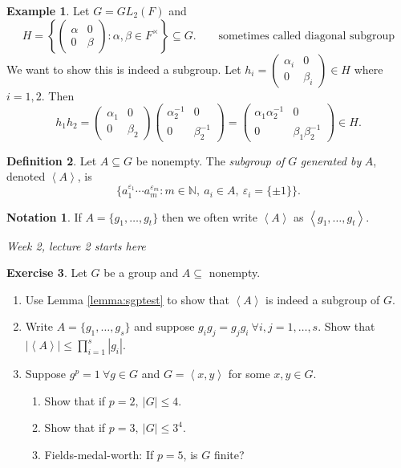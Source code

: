 \documentclass[a4paper]{article}
\newcommand{\la}{\left\langle}
\newcommand{\ra}{\right\rangle}
\newcommand{\N}{\mathbb{N}}
\theoremstyle{definition}
\newtheorem{defn}{Definition}[subsection]
\newtheorem{example}[defn]{Example}
\newtheorem{exe}[defn]{Exercise}
\newtheorem*{notation}{Notation}
\begin{document}
\begin{example}
Let $G=GL_2(F)$ and
\[
H=\left\{\begin{pmatrix}
  \alpha & 0 \\ 0 & \beta
\end{pmatrix}:\alpha,\beta\in F^{\times}\right\} \subseteq G. \qquad\text{sometimes called diagonal subgroup}
\]
We want to show this is indeed a subgroup. Let $h_i=\begin{pmatrix}
  \alpha_i & 0 \\ 0 & \beta_i
\end{pmatrix}\in H$ where $i=1,2$. Then
\[
h_1h_2=\begin{pmatrix}
  \alpha_1 & 0 \\ 0 & \beta_2
\end{pmatrix}\begin{pmatrix}
  \alpha_2^{-1} & 0 \\ 0 & \beta_2^{-1}
\end{pmatrix}=\begin{pmatrix}
  \alpha_1 \alpha_2^{-1} & 0 \\ 0 & \beta_1\beta_2^{-1}
\end{pmatrix}\in H .
\]
\end{example}
\begin{defn}
Let $A\subseteq G$ be nonempty. The \textit{subgroup of} $G$ \textit{generated by} $A$, denoted $\la A\ra$, is
\[
\{a_1^{\varepsilon_1}\cdots a_m^{\varepsilon_m}:m\in\N,\ a_i\in A,\ \varepsilon_i=\{\pm 1\}\}.
\]
\end{defn}
\begin{notation}
If $A=\{g_1,\ldots,g_t\}$ then we often write $\la A\ra$ as $\la g_1,\ldots,g_t\ra$.
\end{notation}

\begin{flushright}
\textit{Week 2, lecture 2 starts here}
\end{flushright}

\begin{exe}
Let $G$ be a group and $A\subseteq$ nonempty.
\begin{enumerate}
\item Use Lemma \ref{lemma:sgptest} to show that $\la A\ra$ is indeed a subgroup of $G$.
\item Write $A=\{g_1,\ldots,g_s\}$ and suppose $g_ig_j=g_jg_i \ \forall i,j=1,\ldots,s$. Show that $|\la A\ra|\leq \prod_{i=1}^s |g_i|$.
\item Suppose $g^p=1 \ \forall g\in G$ and $G=\la x,y\ra$ for some $x,y\in G$.
\begin{enumerate}
\item Show that if $p=2,\ |G|\leq 4$.
\item Show that if $p=3,\ |G|\leq 3^4$.
\item Fields-medal-worth: If $p=5$, is $G$ finite?
\end{enumerate}
\end{enumerate}
\end{exe}
\end{document}
